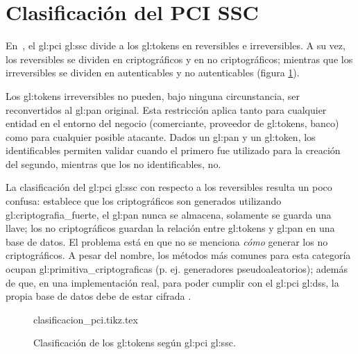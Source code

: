 \section{Clasificación del PCI SSC}
\label{sec:pci_dss}

En~\cite{pci_tokens}, el \gls{gl:pci} \gls{gl:ssc} divide a los
\glspl{gl:token} en reversibles e irreversibles. A su vez, los reversibles se
dividen en criptográficos y en no criptográficos; mientras que los
irreversibles se dividen en autenticables y no autenticables (figura
\ref{fig:division_tokens}).

Los \glspl{gl:token} irreversibles no pueden, bajo ninguna circunstancia, ser
reconvertidos al \gls{gl:pan} original. Esta restricción aplica tanto para
cualquier entidad en el entorno del negocio (comerciante, proveedor de
\glspl{gl:token}, banco) como para cualquier posible atacante. Dados un
\gls{gl:pan} y un \gls{gl:token}, los identificables permiten validar cuando el
primero fue utilizado para la creación del segundo, mientras que los no
identificables, no.

La clasificación del \gls{gl:pci} \gls{gl:ssc} con respecto a los reversibles
resulta un poco confusa: establece que los criptográficos son generados
utilizando \gls{gl:criptografia_fuerte}, el \gls{gl:pan} nunca se almacena,
solamente se guarda una llave; los no criptográficos guardan la relación entre
\glspl{gl:token} y \gls{gl:pan} en una base de datos. El problema está en que
no se menciona \textit{cómo} generar los no criptográficos. A pesar del nombre,
los métodos más comunes para esta categoría ocupan
\glspl{gl:primitiva_criptografica} (p. ej. generadores pseudoaleatorios);
además de que, en una implementación real, para poder cumplir con el
\gls{gl:pci} \gls{gl:dss}, la propia base de datos debe de estar cifrada
\cite{pci_dss}.

\begin{figure}
  \begin{center}
    {clasificacion_pci.tikz.tex}
    \caption{Clasificación de los \glspl{gl:token}
      según \gls{gl:pci} \gls{gl:ssc}.}
    \label{fig:division_tokens}
  \end{center}
\end{figure}
